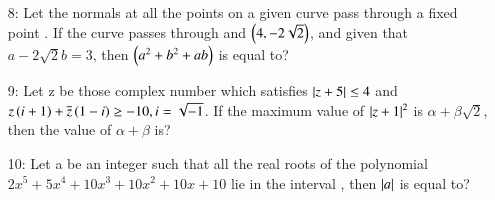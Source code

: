 \documentclass[journal,12pt,twocolumn]{IEEEtran}
\theoremstyle{remark}
\begin{document}
\begin{enumerate}
\item[8:] Let the normals at all the points on a given curve pass through a fixed point . If the curve passes through  and $\left(4,-2\sqrt{2}\right)$, and given that $a-2\sqrt{2}b = 3$, then $\left(a^2+b^2+ab\right)$ is equal to?\vspace{0.5mm}\\
\item[9:] Let z be those complex number which satisfies $\left\vert z+5\right\vert\leq 4$ and $z\left(i+1\right)+\overline{z}\left(1-i\right)\geq-10, i = \sqrt{-1}$. If the maximum value of $\left\vert z+1\right\vert^2$ is $\alpha + \beta \sqrt{2}$, then the value of $\alpha+\beta$ is?\vspace{0.5mm}\\
\item[10:] Let a be an integer such that all the real roots of the polynomial $2x^5+5x^4+10x^3+10x^2+10x+10$ lie in the interval , then $\left\vert a\right\vert$ is equal to?
\end{enumerate}
\end{document}

